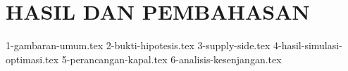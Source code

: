 \chapter{HASIL DAN PEMBAHASAN}
\label{chap:analisis-pembahasan}

{1-gambaran-umum.tex}
{2-bukti-hipotesis.tex}
{3-supply-side.tex}
{4-hasil-simulasi-optimasi.tex}
{5-perancangan-kapal.tex}
{6-analisis-kesenjangan.tex}